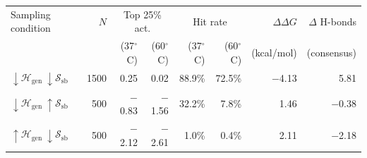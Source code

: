 \begin{tabular}{lrrrrrrr}
\toprule
Sampling condition & $N$ & \multicolumn{2}{c}{Top 25\% act.} & \multicolumn{2}{c}{Hit rate} & $\Delta\Delta G$ & $\Delta$ H-bonds \\
 & & (37$^\circ$C) & (60$^\circ$C) & (37$^\circ$C) & (60$^\circ$C) & (kcal/mol) & (consensus) \\
\midrule
$\downarrow \mathcal{H}_\mathrm{gen}\ \downarrow \mathcal{S}_\mathrm{sb}$ & 1500 & 0.25 & 0.02 & 88.9\% & 72.5\% & $-$4.13 & 5.81 \\
$\downarrow \mathcal{H}_\mathrm{gen}\ \uparrow \mathcal{S}_\mathrm{sb}$ & 500 & $-$0.83 & $-$1.56 & 32.2\% & 7.8\% & 1.46 & $-$0.38 \\
$\uparrow \mathcal{H}_\mathrm{gen}\ \downarrow \mathcal{S}_\mathrm{sb}$ & 500 & $-$2.12 & $-$2.61 & 1.0\% & 0.4\% & 2.11 & $-$2.18 \\
\bottomrule
\end{tabular}
